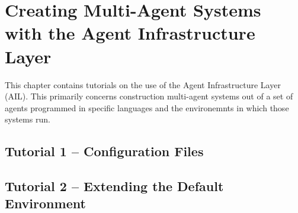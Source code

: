 %

\chapter{Creating Multi-Agent Systems with the Agent Infrastructure Layer}
\label{chap:ail}

This chapter contains tutorials on the use of the Agent Infrastructure Layer (AIL).  This primarily concerns construction multi-agent systems out of a set of agents programmed in specific languages and the environemnts in which those systems run.

\section{Tutorial 1 -- Configuration Files}

{
  \let\section\subsection
  \let\subsection\subsubsection
  \let\subsubsection\paragraph
  
  
  }

\section{Tutorial 2 -- Extending the Default Environment}

